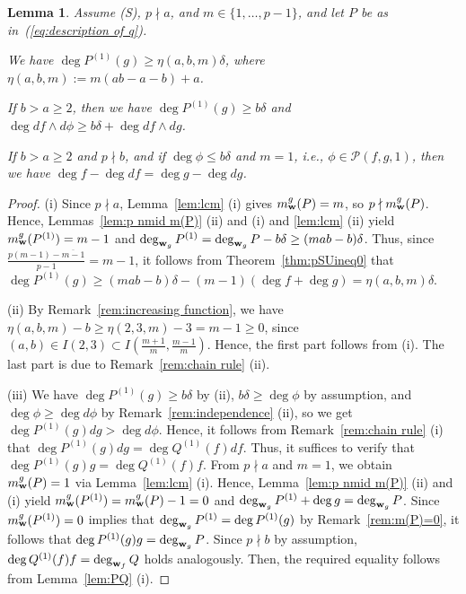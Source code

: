 \documentclass{amsart}
\theoremstyle{plain}
\newtheorem{lem}[thm]{Lemma}
\theoremstyle{definition}
\newcommand{\nd}{\noindent}
\newcommand{\ol}{\overline}
\newcommand{\w}{{\bf w}}
\begin{document}
\begin{lem}\label{lem:deg P'(g)}
Assume {\rm (S)}, 
$p\nmid a$, and $m\in \{ 1,\ldots ,p-1\} $, 
and let $P$ be as in~{\rm (\ref{eq:description of q})}. 

\nd{\rm (i)} 
We have $\deg P^{(1)}(g)\ge \eta (a,b,m)\delta $, 
where $\eta (a,b,m):=m(ab-a-b)+a$. 


\nd{\rm (ii)} 
If $b>a\ge 2$, 
then we have $\deg P^{(1)}(g)\ge b\delta $ 
and $\deg df\wedge d\phi \ge b\delta +\deg df\wedge dg$. 


\nd{\rm (iii)} 
If $b>a\ge 2$ and $p\nmid b$, 
and if $\deg \phi \le b\delta $ and $m=1$, 
i.e., $\phi \in \mathcal{P}(f,g,1)$, 
then we have 
$\deg f-\deg df=\deg g-\deg dg$. 
\end{lem}
\begin{proof}
(i) Since $p\nmid a$, 
Lemma~\ref{lem:lcm} (i) gives $m_{\w }^g(P)=m$, 
so $p\nmid m_{\w }^g(P)$. 
Hence, 
Lemmas~\ref{lem:p nmid m(P)} (ii) and (i) and \ref{lem:lcm} (ii) yield 
$m_{\w }^g(P^{(1)})=m-1$ 
and $\deg _{\w _g}P^{(1)}=\deg _{\w _g}P-b\delta 
\ge (mab-b)\delta$. 
Thus, 
since $\frac{p(m-1)-\ol{m-1}}{p-1}=m-1$, 
it follows from Theorem~\ref{thm:pSUineq0} that 
$\deg P^{(1)}(g)
\ge (mab-b)\delta -(m-1)(\deg f+\deg g)
=\eta (a,b,m)\delta $. 



(ii) 
By Remark~\ref{rem:increasing function}, 
we have $\eta (a,b,m)-b\ge \eta (2,3,m)-3=m-1\ge 0$, 
since $(a,b)\in I(2,3)\subset I(\frac{m+1}{m},\frac{m-1}{m})$. 
Hence, the first part follows from (i). 
The last part is due to Remark~\ref{rem:chain rule} (ii). 




(iii) 
We have $\deg P^{(1)}(g)\ge b\delta $ by (ii), 
$b\delta \ge \deg \phi $ by assumption, 
and $\deg \phi \ge \deg d\phi $ by Remark~\ref{rem:independence} (ii), 
so we get $\deg P^{(1)}(g)dg>\deg d\phi $. 
Hence, it follows from 
Remark~\ref{rem:chain rule} (i) 
that $\deg P^{(1)}(g)dg=\deg Q^{(1)}(f)df$. 
Thus, 
it suffices to verify that 
$\deg P^{(1)}(g)g=\deg Q^{(1)}(f)f$. 
From $p\nmid a$ and $m=1$, 
we obtain $m_{\w }^g(P)=1$ via Lemma~\ref{lem:lcm} (i). 
Hence, 
Lemma~\ref{lem:p nmid m(P)} (ii) and (i) yield 
$m_{\w }^g(P^{(1)})=m_{\w }^g(P)-1=0$ and 
$\deg _{\w _g}P^{(1)}+\deg g=\deg _{\w _g}P$. 
Since $m_{\w }^g(P^{(1)})=0$ 
implies that $\deg _{\w _g}P^{(1)}=\deg P^{(1)}(g)$ 
by Remark~\ref{rem:m(P)=0}, 
it follows that $\deg P^{(1)}(g)g=\deg _{\w _g}P$. 
Since $p\nmid b$ by assumption, 
$\deg Q^{(1)}(f)f=\deg _{\w _f}Q$ holds analogously. 
Then, 
the required equality follows from Lemma~\ref{lem:PQ} (i). 
\end{proof}
\end{document}
